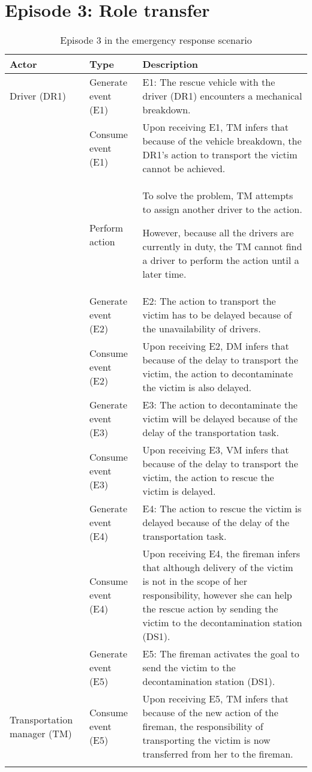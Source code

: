 \section{Episode 3: Role transfer} %
\label{sec:episode_3_responsibility_transfer}
\footnotesize
{
\begin{longtable}{>{\raggedright}p{1.2in}>{\raggedright}p{1.2in}>{\raggedright}p{3in}}
\toprule 
\textbf{Actor} & \textbf{Type} & \textbf{Description}\tabularnewline
\midrule 
Driver (DR1) & Generate event (E1) & E1: The rescue vehicle with the driver (DR1) encounters a mechanical
breakdown.\tabularnewline
\midrule 
\multirow{3}{1.2in}{Transportation manager (TM)} & Consume event (E1) & Upon receiving E1, TM infers that because of the vehicle breakdown,
the DR1's action to transport the victim cannot be achieved.\tabularnewline
\cmidrule{2-3} 
 & Perform action & To solve the problem, TM attempts to assign another driver to the
action.

However, because all the drivers are currently in duty, the TM cannot
find a driver to perform the action until a later time.\tabularnewline
\cmidrule{2-3} 
 & Generate event (E2) & E2: The action to transport the victim has to be delayed because of
the unavailability of drivers.\tabularnewline
\midrule 
\multirow{2}{1.2in}{Decontamination manager (DM)} & Consume event (E2) & Upon receiving E2, DM infers that because of the delay to transport
the victim, the action to decontaminate the victim is also delayed.\tabularnewline
\cmidrule{2-3} 
 & Generate event (E3) & E3: The action to decontaminate the victim will be delayed because
of the delay of the transportation task.\tabularnewline
\midrule 
\multirow{2}{1.2in}{Victim manager (VM)} & Consume event (E3) & Upon receiving E3, VM infers that because of the delay to transport
the victim, the action to rescue the victim is delayed.\tabularnewline
\cmidrule{2-3} 
 & Generate event (E4) & E4: The action to rescue the victim is delayed because of the delay
of the transportation task.\tabularnewline
\midrule 
\multirow{2}{1.2in}{Fireman} & Consume event (E4) & Upon receiving E4, the fireman infers that although delivery of the
victim is not in the scope of her responsibility, however she can
help the rescue action by sending the victim to the decontamination
station (DS1). \tabularnewline
\cmidrule{2-3} 
 & Generate event (E5) & E5: The fireman activates the goal to send the victim to the decontamination
station (DS1). \tabularnewline
\midrule 
Transportation manager (TM) & Consume event (E5) & Upon receiving E5, TM infers that because of the new action of the
fireman, the responsibility of transporting the victim is now transferred
from her to the fireman.\tabularnewline
\bottomrule
\caption{Episode 3 in the emergency response scenario}
\label{tab:episode_3_appendix}
\end{longtable}
}

